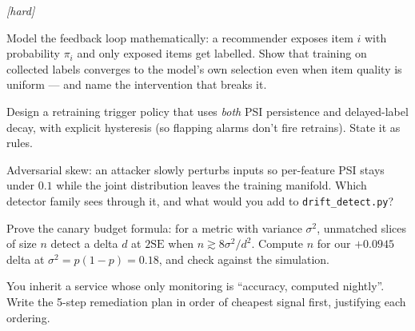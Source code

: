 \emph{[hard]}
\begin{exercise}
Model the feedback loop mathematically: a recommender exposes item
$i$ with probability $\pi_i$ and only exposed items get labelled.
Show that training on collected labels converges to the model's own
selection even when item quality is uniform --- and name the
intervention that breaks it.
\end{exercise}
\begin{exercise}
Design a retraining trigger policy that uses \emph{both} PSI
persistence and delayed-label decay, with explicit hysteresis
(so flapping alarms don't fire retrains). State it as rules.
\end{exercise}
\begin{exercise}
Adversarial skew: an attacker slowly perturbs inputs so per-feature
PSI stays under $0.1$ while the joint distribution leaves the
training manifold. Which detector family sees through it, and what
would you add to \texttt{drift\_detect.py}?
\end{exercise}
\begin{exercise}
Prove the canary budget formula: for a metric with variance
$\sigma^2$, unmatched slices of size $n$ detect a delta $d$ at
$2\mathrm{SE}$ when $n \gtrsim 8\sigma^2/d^2$. Compute $n$ for our
$+0.0945$ delta at $\sigma^2 = p(1-p) = 0.18$, and check against the
simulation.
\end{exercise}
\begin{exercise}
You inherit a service whose only monitoring is ``accuracy, computed
nightly''. Write the 5-step remediation plan in order of cheapest
signal first, justifying each ordering.
\end{exercise}

